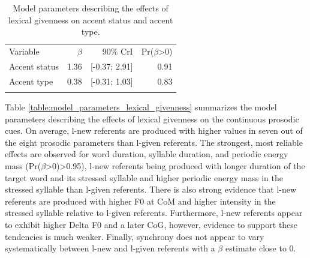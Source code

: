 \begin{table}[]
\begin{tabular}{lrrr}
\lsptoprule
\multicolumn{4}{c}{Lexical givenness} \\ \hline
Variable    & $\beta$ & 90\% CrI  & Pr($\beta$\textgreater{}0) \\ \hline
Accent status    & 1.36       & {[}-0.37; 2.91{]}  & 0.91                          \\
Accent type        & 0.38       & {[}-0.31; 1.03{]} & 0.83                          \\
\lspbottomrule
\end{tabular}
\caption{Model parameters describing the effects of lexical givenness on accent status and accent type.}
\label{table:model_parameterscat_lexical_givenness}
\end{table}

Table \ref{table:model_parameters_lexical_givenness} summarizes the model parameters describing the effects of lexical givenness on the continuous prosodic cues. On average, l-new referents are produced with higher values in seven out of the eight prosodic parameters than l-given referents. The strongest, most reliable effects are observed for word duration, syllable duration, and periodic energy mass (Pr($\beta$\textgreater{}0)\textgreater{}0.95), l-new referents being produced with longer duration of the target word and its stressed syllable and higher periodic energy mass in the stressed syllable than l-given referents. There is also strong evidence that l-new referents are produced with higher F0 at CoM and higher intensity in the stressed syllable relative to l-given referents. Furthermore, l-new referents appear to exhibit higher Delta F0 and a later CoG, however, evidence to support these tendencies is much weaker. Finally, synchrony does not appear to vary systematically between l-new and l-given referents with a $\beta$ estimate close to 0.

